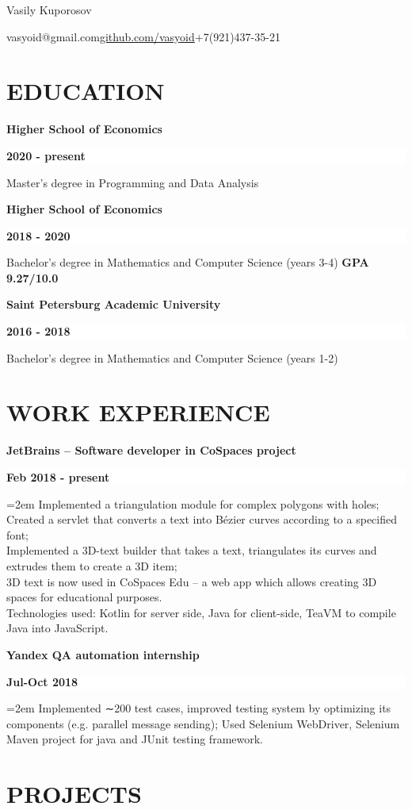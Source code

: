 \documentclass[paper=a4,fontsize=11pt]{scrartcl} %
\newcommand{\MyName}[1]{ %
	\Huge \usefont{OT1}{phv}{b}{n} \begin{center}#1\end{center}
	\par \normalsize \normalfont \vspace*{-1.5em}}
\newcommand{\MySlogan}[1]{ %
	\large \usefont{OT1}{phv}{m}{n} \begin{center}#1\end{center}
	\par \normalsize \normalfont}
\newcommand{\NewPart}[1]{\section*{\uppercase{#1}}}
\newcommand{\EducationEntry}[3]{
	\noindent \textbf{#1} \hfill      %
	\colorbox{White}{%
		\parbox{8em}{%
			\hfill\color{Black}\textbf{#2}}} \par  %
	\small #3 %
	\normalsize \par}
\newcommand{\SomeEntry}[4]{
	\noindent \textbf{#1} \hfill      %
	\colorbox{White}{%
		\parbox{12em}{%
			\hfill\color{Black}\textbf{#2}}} \par  %
	\noindent \texttt{#3} \par        %
	\noindent\hangindent=2em\hangafter=0 \small #4 %
	\normalsize \par}
\begin{document}
	
	\MyName{Vasily Kuporosov}
	\MySlogan{vasyoid@gmail.com\qquad\href{http://github.com/vasyoid}{github.com/vasyoid}\qquad+7(921)437-35-21}
	
	\NewPart{Education}
	
	\EducationEntry{Higher School of Economics}{2020 - present}{Master's degree in Programming and Data Analysis}
	
	\EducationEntry{Higher School of Economics}{2018 - 2020}{Bachelor's degree in Mathematics and Computer Science (years 3-4) \textbf{GPA 9.27/10.0}}
	
	\EducationEntry{Saint Petersburg Academic University}{2016 - 2018}{Bachelor’s degree in Mathematics and Computer Science (years 1-2) }
	
	\NewPart{Work Experience}
	
	\SomeEntry{JetBrains – Software developer in CoSpaces project}{Feb 2018 - present}{\vspace{-10pt}}{Implemented a triangulation module for complex polygons with holes;\\
		Created a servlet that converts a text into Bézier curves according to a specified font;\\
		Implemented a 3D-text builder that takes a text, triangulates its curves and extrudes them to create a 3D item;\\
		3D text is now used in CoSpaces Edu – a web app which allows creating 3D spaces for educational purposes.\\
		Technologies used: Kotlin for server side, Java for client-side, TeaVM to compile Java into JavaScript.}
	
	\SomeEntry{Yandex QA automation internship}{Jul-Oct 2018}{\vspace{-10pt}}{Implemented ∼200 test cases, improved testing system by optimizing its components (e.g. parallel message sending);
		Used Selenium WebDriver, Selenium Maven project for java and JUnit testing framework.}
	
	\NewPart{Projects}
	
\end{document}
